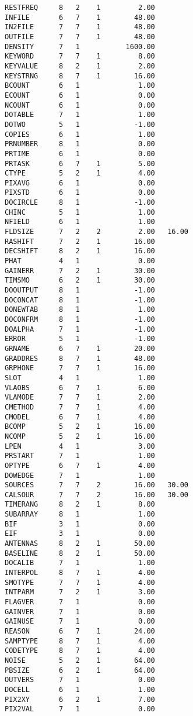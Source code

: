 \begin{verbatim}
RESTFREQ     8   2    1         2.00
INFILE       6   7    1        48.00
IN2FILE      7   7    1        48.00
OUTFILE      7   7    1        48.00
DENSITY      7   1           1600.00
KEYWORD      7   7    1         8.00
KEYVALUE     8   2    1         2.00
KEYSTRNG     8   7    1        16.00
BCOUNT       6   1              1.00
ECOUNT       6   1              0.00
NCOUNT       6   1              0.00
DOTABLE      7   1              1.00
DOTWO        5   1             -1.00
COPIES       6   1              1.00
PRNUMBER     8   1              0.00
PRTIME       6   1              0.00
PRTASK       6   7    1         5.00
CTYPE        5   2    1         4.00
PIXAVG       6   1              0.00
PIXSTD       6   1              0.00
DOCIRCLE     8   1             -1.00
CHINC        5   1              1.00
NFIELD       6   1              1.00
FLDSIZE      7   2    2         2.00   16.00
RASHIFT      7   2    1        16.00
DECSHIFT     8   2    1        16.00
PHAT         4   1              0.00
GAINERR      7   2    1        30.00
TIMSMO       6   2    1        30.00
DOOUTPUT     8   1             -1.00
DOCONCAT     8   1             -1.00
DONEWTAB     8   1              1.00
DOCONFRM     8   1             -1.00
DOALPHA      7   1             -1.00
ERROR        5   1             -1.00
GRNAME       6   7    1        20.00
GRADDRES     8   7    1        48.00
GRPHONE      7   7    1        16.00
SLOT         4   1              1.00
VLAOBS       6   7    1         6.00
VLAMODE      7   7    1         2.00
CMETHOD      7   7    1         4.00
CMODEL       6   7    1         4.00
BCOMP        5   2    1        16.00
NCOMP        5   2    1        16.00
LPEN         4   1              3.00
PRSTART      7   1              1.00
OPTYPE       6   7    1         4.00
DOWEDGE      7   1              1.00
SOURCES      7   7    2        16.00   30.00
CALSOUR      7   7    2        16.00   30.00
TIMERANG     8   2    1         8.00
SUBARRAY     8   1              1.00
BIF          3   1              0.00
EIF          3   1              0.00
ANTENNAS     8   2    1        50.00
BASELINE     8   2    1        50.00
DOCALIB      7   1              1.00
INTERPOL     8   7    1         4.00
SMOTYPE      7   7    1         4.00
INTPARM      7   2    1         3.00
FLAGVER      7   1              0.00
GAINVER      7   1              0.00
GAINUSE      7   1              0.00
REASON       6   7    1        24.00
SAMPTYPE     8   7    1         4.00
CODETYPE     8   7    1         4.00
NOISE        5   2    1        64.00
PBSIZE       6   2    1        64.00
OUTVERS      7   1              0.00
DOCELL       6   1              1.00
PIX2XY       6   2    1         7.00
PIX2VAL      7   1              0.00
\end{verbatim}
